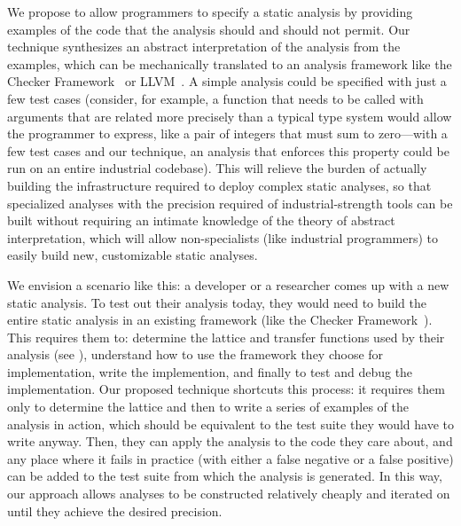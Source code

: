 \documentclass[10pt,conference]{IEEEtran}
\begin{document}
We propose
to allow programmers to specify a static analysis by providing
examples of the code that the analysis should and should not permit.
Our technique synthesizes an abstract interpretation of the analysis
from the examples,
which can be mechanically translated to an analysis framework like
the Checker Framework~\cite{checker-framework} or LLVM~\cite{lattner04:_llvm}.
A simple analysis could be specified
with just a few test cases (consider, for example, a function that needs to
be called with arguments that are related more precisely than a typical
type system would allow the programmer to express, like a pair of integers that
must sum to zero---with a few test cases and our technique, an analysis that
enforces this property could be run on an entire industrial codebase).
This will relieve the burden of actually building the infrastructure
required to deploy complex static analyses, so that specialized analyses
with the precision required of industrial-strength tools can be built without
requiring an intimate knowledge of the theory of abstract interpretation,
which will allow non-specialists (like industrial programmers) to easily
build new, customizable static analyses.

We envision a scenario like this: a developer or a researcher comes up with
a new static analysis. To test out their analysis today, they would need
to build the entire static analysis in an existing framework (like the Checker
Framework~\cite{checker-framework}). This requires them to: determine
the lattice and transfer functions used by their analysis (see ),
understand how
to use the framework they choose for implementation, write the implemention,
and finally to test and debug the implementation. Our proposed technique
shortcuts this process: it requires them only to determine the lattice
and then to write a series of examples of the analysis in action, which
should be equivalent to the test suite they would have to write anyway.
Then, they can apply the analysis to the code they care about, and any
place where it fails in practice (with either a false negative or a false
positive) can be added to the test suite from which the analysis
is generated. In this way, our approach allows analyses to be constructed
relatively cheaply and iterated on until they achieve the desired precision.
\end{document}
